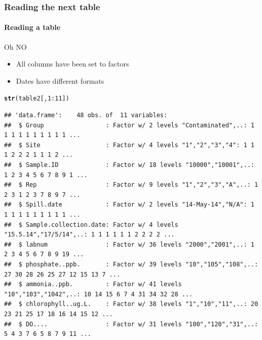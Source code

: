 \documentclass[10pt,handout,english]{beamer}\usepackage[]{graphicx}\usepackage[]{color}
\makeatletter
\newcommand{\hlnum}[1]{\textcolor[rgb]{0.686,0.059,0.569}{#1}}%
\newcommand{\hlopt}[1]{\textcolor[rgb]{0,0,0}{#1}}%
\newcommand{\hlstd}[1]{\textcolor[rgb]{0.345,0.345,0.345}{#1}}%
\newcommand{\hlkwd}[1]{\textcolor[rgb]{0.737,0.353,0.396}{\textbf{#1}}}%
\newenvironment{kframe}{%
 \def\at@end@of@kframe{}%
 \ifinner\ifhmode%
  \def\at@end@of@kframe{\end{minipage}}%
  \begin{minipage}{\columnwidth}%
 \fi\fi%
 \def\FrameCommand##1{\hskip\@totalleftmargin \hskip-\fboxsep
 \colorbox{shadecolor}{##1}\hskip-\fboxsep
     \hskip-\linewidth \hskip-\@totalleftmargin \hskip\columnwidth}%
 \MakeFramed {\advance\hsize-\width
   \@totalleftmargin\z@ \linewidth\hsize
   \@setminipage}}%
 {\par\unskip\endMakeFramed%
 \at@end@of@kframe}
\newenvironment{knitrout}{}{} %
\makeatother
\begin{document}
\begin{frame}[fragile]
  \frametitle{Reading the next table}
  \framesubtitle{Reading a table}
  \begin{alert}{Oh NO}
\begin{itemize}  
\item All columns have been set to factors
\item Dates have different formats
\end{itemize}
\end{alert}
\begin{knitrout}
\color{fgcolor}\begin{kframe}
\begin{alltt}
\hlkwd{str}\hlstd{(table2[,}\hlnum{1}\hlopt{:}\hlnum{11}\hlstd{])}
\end{alltt}
\begin{verbatim}
## 'data.frame':	48 obs. of  11 variables:
##  $ Group                 : Factor w/ 2 levels "Contaminated",..: 1 1 1 1 1 1 1 1 1 1 ...
##  $ Site                  : Factor w/ 4 levels "1","2","3","4": 1 1 1 2 2 2 1 1 1 2 ...
##  $ Sample.ID             : Factor w/ 18 levels "10000","10001",..: 1 2 3 4 5 6 7 8 9 1 ...
##  $ Rep                   : Factor w/ 9 levels "1","2","3","A",..: 1 2 3 1 2 3 7 8 9 7 ...
##  $ Spill.date            : Factor w/ 2 levels "14-May-14","N/A": 1 1 1 1 1 1 1 1 1 1 ...
##  $ Sample.collection.date: Factor w/ 4 levels "15.5.14","17/5/14",..: 1 1 1 1 1 1 2 2 2 2 ...
##  $ labnum                : Factor w/ 36 levels "2000","2001",..: 1 2 3 4 5 6 7 8 9 19 ...
##  $ phosphate..ppb.       : Factor w/ 39 levels "10","105","108",..: 27 30 28 26 25 27 12 15 13 7 ...
##  $ ammonia..ppb.         : Factor w/ 41 levels "10","103","1042",..: 10 14 15 6 7 4 31 34 32 28 ...
##  $ chlorophyll..ug.L.    : Factor w/ 38 levels "1","10","11",..: 20 23 21 25 17 18 16 14 15 12 ...
##  $ DO....                : Factor w/ 31 levels "100","120","31",..: 5 4 3 7 6 5 8 7 9 11 ...
\end{verbatim}
\end{kframe}
\end{knitrout}



\end{frame}
\end{document}
